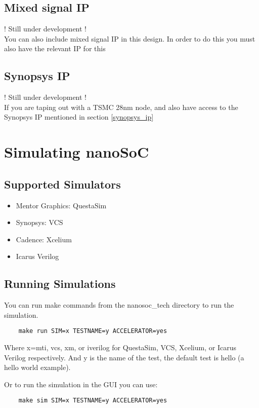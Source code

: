 \documentclass{report}
\begin{document}
\section{Mixed signal IP}
! Still under development !\\
You can also include mixed signal IP in this design. In order to do this you must also have the relevant IP for this 

\section{Synopsys IP}
! Still under development !\\
If you are taping out with a TSMC 28nm node, and also have access to the Synopsys IP mentioned in section \ref{synopsys_ip} 

\chapter{Simulating nanoSoC}
\section{Supported Simulators}
\begin{itemize}
    \item Mentor Graphics: QuestaSim
    \item Synopsys: VCS
    \item Cadence: Xcelium
    \item Icarus Verilog
\end{itemize}

\section{Running Simulations}
You can run make commands from the nanosoc\_tech directory to run the simulation. 

\begin{lstlisting}
    make run SIM=x TESTNAME=y ACCELERATOR=yes
\end{lstlisting}

Where x=mti, vcs, xm, or iverilog for QuestaSim, VCS, Xcelium, or Icarus Verilog respectively.
And y is the name of the test, the default test is hello (a hello world example).

Or to run the simulation in the GUI you can use:

\begin{lstlisting}
    make sim SIM=x TESTNAME=y ACCELERATOR=yes
\end{lstlisting}
\end{document}
